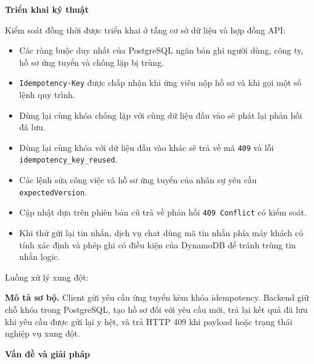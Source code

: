\vspace{0.5em}\noindent\textbf{Triển khai kỹ
thuật}\par

Kiểm soát đồng thời được triển khai ở tầng cơ sở dữ liệu và hợp đồng
API:

\begin{itemize}
\tightlist
\item
  Các ràng buộc duy nhất của PostgreSQL ngăn bản ghi người dùng, công
  ty, hồ sơ ứng tuyển và chống lặp bị trùng.
\item
  \texttt{Idempotency-\allowbreak{}Key} được chấp nhận khi ứng viên nộp hồ sơ và khi
  gọi một số lệnh quy trình.
\item
  Dùng lại cùng khóa chống lặp với cùng dữ liệu đầu vào sẽ phát lại phản
  hồi đã lưu.
\item
  Dùng lại cùng khóa với dữ liệu đầu vào khác sẽ trả về mã \texttt{409}
  và lỗi \texttt{idempotency\_\allowbreak{}key\_\allowbreak{}reused}.
\item
  Các lệnh sửa công việc và hồ sơ ứng tuyển của nhân sự yêu cầu
  \texttt{expectedVersion}.
\item
  Cập nhật dựa trên phiên bản cũ trả về phản hồi \texttt{409\ Conflict}
  có kiểm soát.
\item
  Khi thử gửi lại tin nhắn, dịch vụ chat dùng mã tin nhắn phía máy khách
  có tính xác định và phép ghi có điều kiện của DynamoDB để tránh trùng
  tin nhắn logic.
\end{itemize}

Luồng xử lý xung đột:

\textbf{Mô tả sơ bộ.} Client gửi yêu cầu ứng tuyển kèm khóa idempotency.
Backend giữ chỗ khóa trong PostgreSQL, tạo hồ sơ đối với yêu cầu mới,
trả lại kết quả đã lưu khi yêu cầu được gửi lại y hệt, và trả HTTP 409
khi payload hoặc trạng thái nghiệp vụ xung đột.

\vspace{0.5em}\noindent\textbf{Vấn đề và giải
pháp}\par

